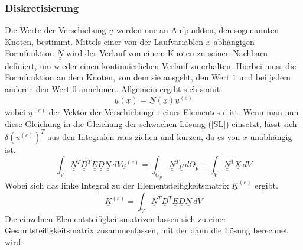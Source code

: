 \subsubsection{Diskretisierung}
Die Werte der Verschiebung $\underline{u}$ werden nur an Aufpunkten, den sogenannten Knoten, bestimmt. Mittels einer von der Laufvariablen $\underline{x}$ abhängigen Formfunktion $\underline{\underline{N}}$ wird der Verlauf von einem Knoten zu seinen Nachbarn definiert, um wieder einen kontinuierlichen Verlauf zu erhalten. Hierbei muss die Formfunktion an dem Knoten, von dem sie ausgeht, den Wert $1$  und bei jedem anderen den Wert $0$ annehmen. Allgemein ergibt sich somit
\begin{equation}
	\underline{u}(\underline{x})=\underline{\underline{N}}(\underline{x})\underline{u}^{(e)}
\end{equation}
wobei $\underline{u}^{(e)}$ der Vektor der Verschiebungen eines Elementes $e$ ist.
Wenn man nun diese Gleichung in die Gleichung der schwachen Lösung (\ref{SL}) einsetzt, lässt sich $\delta(\underline{u}^{(e)})^T$ aus den Integralen raus ziehen und kürzen, da es von $\underline{x}$ unabhängig ist.
\begin{equation}
	\int_{V}^{}\underline{\underline{N}}^T\underline{\underline{D}}^T\underline{\underline{E}}\underline{\underline{D}}\underline{\underline{N}}\,dV\underline{u}^{(e)} = \int_{O_{p}}^{}\underline{\underline{N}}^T\underline{p}\,dO_p + \int_{V}^{}\underline{\underline{N}}^T\underline{X}\,dV
\end{equation}
Wobei sich das linke Integral zu der Elementsteifigkeitsmatrix $\underline{\underline{K}}^{(e)}$ ergibt.
\begin{equation}
	\underline{\underline{K}}^{(e)} = \int_{V}^{}\underline{\underline{N}}^T\underline{\underline{D}}^T\underline{\underline{E}}\underline{\underline{D}}\underline{\underline{N}}\,dV
\end{equation}
Die einzelnen Elementsteifigkeitsmatrizen lassen sich zu einer Gesamtsteifigkeitsmatrix zusammenfassen, mit der dann die Lösung berechnet wird.
\newpage
